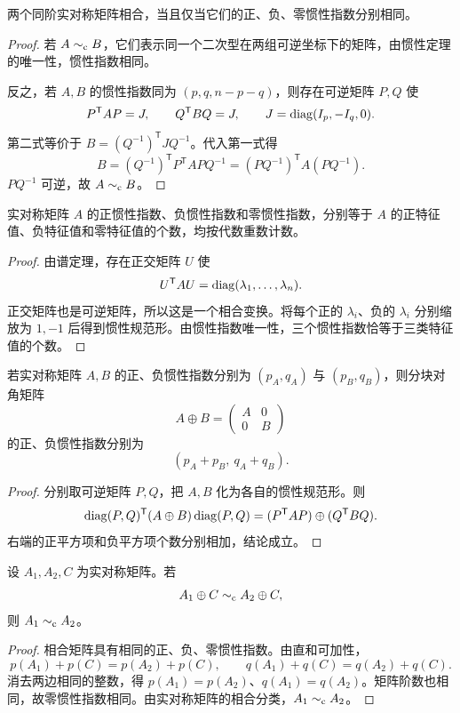 \begin{corollary}[实对称矩阵的相合分类]
两个同阶实对称矩阵相合，当且仅当它们的正、负、零惯性指数分别相同。
\end{corollary}
\begin{proof}
若 $A\sim_{\mathrm c} B$，它们表示同一个二次型在两组可逆坐标下的矩阵，由惯性定理的唯一性，惯性指数相同。

反之，若 $A,B$ 的惯性指数同为 $(p,q,n-p-q)$，则存在可逆矩阵 $P,Q$ 使
\[
P^{\mathsf T}AP=J,\qquad Q^{\mathsf T}BQ=J,\qquad
J=\operatorname{diag}(I_p,-I_q,0).
\]
第二式等价于 $B=(Q^{-1})^{\mathsf T}JQ^{-1}$。代入第一式得
\[
B=(Q^{-1})^{\mathsf T}P^{\mathsf T}APQ^{-1}
=(PQ^{-1})^{\mathsf T}A(PQ^{-1}).
\]
$PQ^{-1}$ 可逆，故 $A\sim_{\mathrm c} B$。
\end{proof}

\begin{corollary}[惯性指数与特征值符号]
实对称矩阵 $A$ 的正惯性指数、负惯性指数和零惯性指数，分别等于 $A$ 的正特征值、负特征值和零特征值的个数，均按代数重数计数。
\end{corollary}
\begin{proof}
由谱定理，存在正交矩阵 $U$ 使
\[
U^{\mathsf T}AU=\operatorname{diag}(\lambda_1,\ldots,\lambda_n).
\]
正交矩阵也是可逆矩阵，所以这是一个相合变换。将每个正的 $\lambda_i$、负的 $\lambda_i$ 分别缩放为 $1,-1$ 后得到惯性规范形。由惯性指数唯一性，三个惯性指数恰等于三类特征值的个数。
\end{proof}

\begin{corollary}[惯性指数对直和可加]
若实对称矩阵 $A,B$ 的正、负惯性指数分别为 $(p_A,q_A)$ 与 $(p_B,q_B)$，则分块对角矩阵
\[
A\oplus B=\begin{pmatrix}A&0\\0&B\end{pmatrix}
\]
的正、负惯性指数分别为
\[
(p_A+p_B,\ q_A+q_B).
\]
\end{corollary}
\begin{proof}
分别取可逆矩阵 $P,Q$，把 $A,B$ 化为各自的惯性规范形。则
\[
\operatorname{diag}(P,Q)^{\mathsf T}(A\oplus B)\operatorname{diag}(P,Q)
=(P^{\mathsf T}AP)\oplus(Q^{\mathsf T}BQ).
\]
右端的正平方项和负平方项个数分别相加，结论成立。
\end{proof}

\begin{corollary}
设 $A_1,A_2,C$ 为实对称矩阵。若
\[
A_1\oplus C\sim_{\mathrm c} A_2\oplus C,
\]
则 $A_1\sim_{\mathrm c} A_2$。
\end{corollary}
\begin{proof}
相合矩阵具有相同的正、负、零惯性指数。由直和可加性，
\[
p(A_1)+p(C)=p(A_2)+p(C),\qquad
q(A_1)+q(C)=q(A_2)+q(C).
\]
消去两边相同的整数，得 $p(A_1)=p(A_2)$、$q(A_1)=q(A_2)$。矩阵阶数也相同，故零惯性指数相同。由实对称矩阵的相合分类，$A_1\sim_{\mathrm c} A_2$。
\end{proof}

